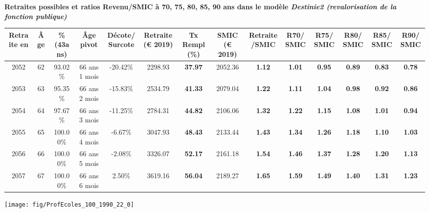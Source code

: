  \vspace{0.1cm} 
{\bf \noindent Retraites possibles et ratios Revenu/SMIC à 70, 75, 80, 85, 90 ans dans le modèle \emph{Destinie2 (revalorisation de la fonction publique)}}  
 
\begin{adjustbox}{max width=\textwidth} 
\begin{tabular}[htb]{|c|c||c|c|c||c|c||c|c||c|c|c|c|c|} 
\hline 
 Retraite en &  Âge &  \%(43ans) &  Âge pivot &  Décote/Surcote &  Retraite (\euro{} 2019) &  Tx Rempl(\%) &  SMIC (\euro{} 2019) &  Retraite/SMIC &  R70/SMIC &  R75/SMIC &  R80/SMIC &  R85/SMIC &  R90/SMIC \\ 
\hline \hline 
 2052 &  62 &  93.02\% &  66 ans 1 mois &  -20.42\% &  2298.93 &  {\bf 37.97} &  2052.36 &  {\bf 1.12} &  {\bf 1.01} &  {\bf {\color{red} 0.95}} &  {\bf {\color{red} 0.89}} &  {\bf {\color{red} 0.83}} &  {\bf {\color{red} 0.78}} \\ 
\hline 
 2053 &  63 &  95.35\% &  66 ans 2 mois &  -15.83\% &  2534.79 &  {\bf 41.33} &  2079.04 &  {\bf 1.22} &  {\bf 1.11} &  {\bf 1.04} &  {\bf {\color{red} 0.98}} &  {\bf {\color{red} 0.92}} &  {\bf {\color{red} 0.86}} \\ 
\hline 
 2054 &  64 &  97.67\% &  66 ans 3 mois &  -11.25\% &  2784.31 &  {\bf 44.82} &  2106.06 &  {\bf 1.32} &  {\bf 1.22} &  {\bf 1.15} &  {\bf 1.08} &  {\bf 1.01} &  {\bf {\color{red} 0.94}} \\ 
\hline 
 2055 &  65 &  100.00\% &  66 ans 4 mois &  -6.67\% &  3047.93 &  {\bf 48.43} &  2133.44 &  {\bf 1.43} &  {\bf 1.34} &  {\bf 1.26} &  {\bf 1.18} &  {\bf 1.10} &  {\bf 1.03} \\ 
\hline 
 2056 &  66 &  100.00\% &  66 ans 5 mois &  -2.08\% &  3326.07 &  {\bf 52.17} &  2161.18 &  {\bf 1.54} &  {\bf 1.46} &  {\bf 1.37} &  {\bf 1.28} &  {\bf 1.20} &  {\bf 1.13} \\ 
\hline 
 2057 &  67 &  100.00\% &  66 ans 6 mois &  2.50\% &  3619.16 &  {\bf 56.04} &  2189.27 &  {\bf 1.65} &  {\bf 1.59} &  {\bf 1.49} &  {\bf 1.40} &  {\bf 1.31} &  {\bf 1.23} \\ 
\hline 
\hline 
\end{tabular} 
\end{adjustbox} 
 
 \vspace{0.1cm} 

 {\hspace{-2.2cm}\texttt{[image: fig/ProfEcoles\_100\_1990\_22\_0]}} 

\newpage 
 
